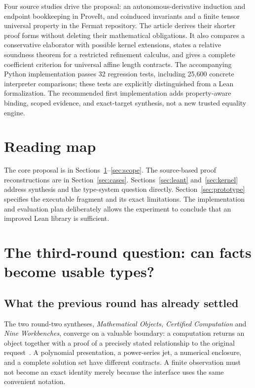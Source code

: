 \documentclass[11pt,letterpaper]{article}
\theoremstyle{definition}
\theoremstyle{remark}
\begin{document}
Four source studies drive the proposal: an autonomous-derivative induction and
endpoint bookkeeping in ProveIt, and coinduced invariants and a finite tensor
universal property in the Fermat repository. The article derives their shorter
proof forms without deleting their mathematical obligations. It also compares a
conservative elaborator with possible kernel extensions, states a relative
soundness theorem for a restricted refinement calculus, and gives a complete
coefficient criterion for universal affine length contracts. The accompanying
Python implementation passes 32 regression tests, including 25,600 concrete
interpreter comparisons; these tests are explicitly distinguished from a Lean
formalization. The recommended first implementation adds property-aware binding,
scoped evidence, and exact-target synthesis, not a new trusted equality engine.

\section*{Reading map}
The core proposal is in Sections~\ref{sec:thesis}--\ref{sec:scope}. The source-based
proof reconstructions are in Section~\ref{sec:cases}. Sections~\ref{sec:leant}
and~\ref{sec:kernel} address synthesis and the type-system question directly.
Section~\ref{sec:prototype} specifies the executable fragment and its exact
limitations. The implementation and evaluation plan deliberately allows the
experiment to conclude that an improved Lean library is sufficient.
\clearpage
\tableofcontents
\clearpage
{}

\section{The third-round question: can facts become usable types?}\label{sec:thesis}

\subsection{What the previous round has already settled}
The two round-two syntheses, \emph{Mathematical Objects, Certified Computation}
and \emph{Nine Workbenches}, converge on a valuable boundary: a computation returns
an object together with a proof of a precisely stated relationship to the
original request~\cite{B1,B2}. A polynomial presentation, a power-series jet, a
numerical enclosure, and a complete solution set have different contracts. A
finite observation must not become an exact identity merely because the
interface uses the same convenient notation.
\end{document}
